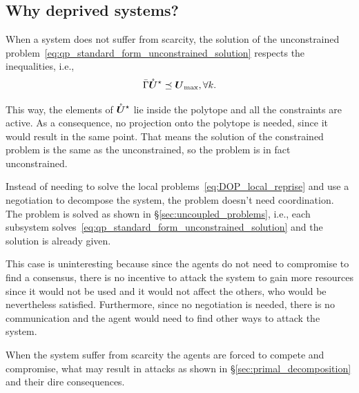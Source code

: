 \documentclass[../main.tex]{subfiles}
\begin{document}
\subsection{Why deprived systems?}\label{sec:why-deprived-systems}

When a system does not suffer from scarcity, the solution of the unconstrained problem~\eqref{eq:qp_standard_form_unconstrained_solution} respects the inequalities, i.e.,
\begin{equation}
\bar{\Gamma}{\mathring{\boldsymbol{U}}^{\star}}\preceq {\boldsymbol{U}}_{\text{max}},\forall k.
\end{equation}

This way, the elements of ${\mathring{\boldsymbol{U}}^{\star}}$ lie inside the polytope and all the constraints are active.
As a consequence, no projection onto the polytope is needed, since it would result in the same point.
That means the solution of the constrained problem is the same as the unconstrained, so the problem is in fact unconstrained.

Instead of needing to solve the local problems~\eqref{eq:DOP_local_reprise} and use a negotiation to decompose the system, the problem doesn't need coordination.
The problem is solved as shown in \S\ref{sec:uncoupled_problems}, i.e., each subsystem solves~\eqref{eq:qp_standard_form_unconstrained_solution} and the solution is already given.

This case is uninteresting because since the agents do not need to compromise to find a consensus, there is no incentive to attack the system to gain more resources since it would not be used and it would not affect the others, who would be nevertheless satisfied.
Furthermore, since no negotiation is needed, there is no communication and the agent would need to find other ways to attack the system.

When the system suffer from scarcity the agents are forced to compete and compromise, what may result in attacks as shown in \S\ref{sec:primal_decomposition} and their dire consequences.
\end{document}
